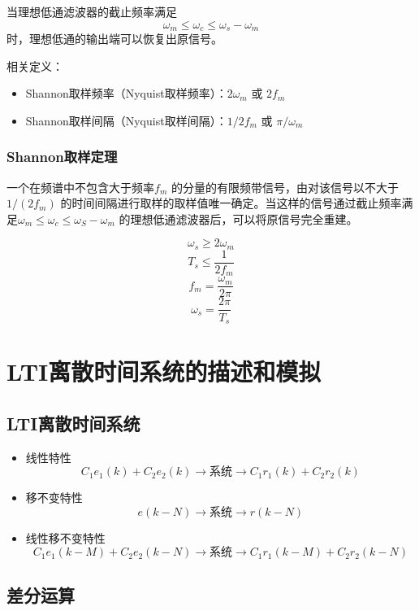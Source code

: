 \documentclass[UTF8]{ctexart}
\begin{document}
当理想低通滤波器的截止频率满足
$$
\omega_{m} \leq \omega_{c} \leq \omega_{s}-\omega_{m}
$$
时，理想低通的输出端可以恢复出原信号。

相关定义：
\begin{itemize}
    \item Shannon取样频率（Nyquist取样频率）：$2 \omega_{m}$ 或 $2 f_{m}$
    \item Shannon取样间隔（Nyquist取样间隔）：$1 / 2 f_{m}$ 或 $\pi / \omega_{m}$
\end{itemize}

\subsubsection{Shannon取样定理}
一个在频谱中不包含大于频率$f_{m}$ 的分量的有限频带信号，由对该信号以不大于$1/(2f_m)$ 的时间间隔进行取样的取样值唯一确定。当这样的信号通过截止频率满足$\omega_{m} \leq \omega_{c} \leq \omega_{S}-\omega_{m}$ 的理想低通滤波器后，可以将原信号完全重建。

$$
\omega_{s} \geq 2 \omega_{m}
$$
$$
T_{s} \leq \frac{1}{2 f_{m}}
$$
$$
f_{m}=\frac{\omega_{m}}{2 \pi}
$$
$$
\omega_{s}=\frac{2 \pi}{T_{s}}
$$

\section{LTI离散时间系统的描述和模拟}

\subsection{LTI离散时间系统}

\begin{itemize}
    \item 线性特性
    $$
    C_1e_1(k)+C_2e_2(k) \rightarrow \boxed{\text{系统}} \rightarrow C_1r_1(k)+C_2r_2(k)
    $$
    
    \item 移不变特性
    $$
    e(k-N) \rightarrow \boxed{\text{系统}} \rightarrow r(k-N)
    $$
    
    \item 线性移不变特性
    $$
    C_1e_1(k-M)+C_2e_2(k-N) \rightarrow \boxed{\text{系统}} \rightarrow C_1r_1(k-M)+C_2r_2(k-N)
    $$
\end{itemize}


\subsection{差分运算}
\end{document}
